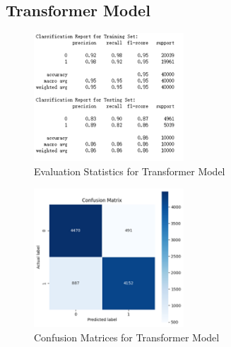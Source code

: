 \documentclass[11pt,a4paper]{article}
\begin{document}
\subsection{Transformer Model}

\begin{figure}[ht]
    \centering
    \includegraphics[width=0.5\textwidth]{tran1.png}
    \caption{Evaluation Statistics for Transformer Model}
    \label{fig:polarity_distribution}
\end{figure}

\begin{figure}[ht]
    \centering
    \includegraphics[width=0.5\textwidth]{tran2.png}
    \caption{Confusion Matrices for Transformer Model}
    \label{fig:polarity_distribution}
\end{figure}
\end{document}
